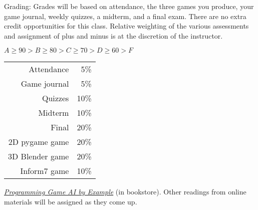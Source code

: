\documentclass{article}
\begin{document}
\begin{description}
\begin{multicols}{2}
\item [Grading:] Grades will be based on attendance, the three games
  you produce, your game journal, weekly quizzes, a midterm, and a final
  exam.  There are no extra credit opportunities for this class.
  Relative weighting of the various assessments and assignment of plus
  and minus is at the discretion of the instructor.

$A \ge 90 > B \ge 80 > C \ge 70 > D \ge 60 > F$

\columnbreak

\begin{centering}
\begin{tabular}{|rr|}\hline
Attendance & 5\%\\
 Game journal &    5\%\\
 Quizzes &         10\%\\
 Midterm &         10\%\\
 Final &           20\%\\
 2D pygame game &  20\%\\
 3D Blender game & 20\%\\
 Inform7 game &        10\%\\
\hline
\end{tabular}

\end{centering}
\end{multicols}


\item[Texts and Readings:] 


\href{http://www.ai-junkie.com/books/toc_pgaibe.html}
{\em Programming Game AI by Example} (in bookstore).
Other readings from online materials will be assigned as they come up.


\item [Schedule:]\mbox{}


\end{description}
\end{document}
